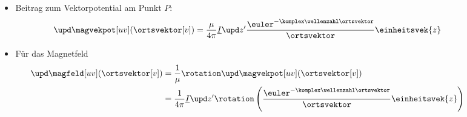 \begin{frame}
\begin{itemize}[<+->]
\begin{columns}
\begin{column}{.35\textwidth}
\begin{tikzpicture}[scale=5,tdplot_main_coords]
\end{tikzpicture}
\end{column}
\begin{column}{.65\textwidth}
  \begin{itemize}[<+->]
  \item Beitrag zum Vektorpotential am Punkt \(P\):
    \begin{equation*}
      \upd\magvekpot[uv](\ortsvektor[v]) = \frac{\mu}{4\pi} \underline{I} \upd z^\prime \frac{\euler^{-\komplex\wellenzahl\ortsvektor}}{\ortsvektor} \einheitsvek{z}
    \end{equation*}
  \item Für das Magnetfeld
    \begin{align*}
      \upd\magfeld[uv](\ortsvektor[v]) &= \frac{1}{\mu} \rotation \upd\magvekpot[uv](\ortsvektor[v])\\
      &= \frac{1}{4\pi} \underline{I} \upd z^\prime \rotation\left(\frac{\euler^{-\komplex\wellenzahl\ortsvektor}}{\ortsvektor} \einheitsvek{z}\right)
      \end{align*}
      \end{itemize}
\end{column}
\end{columns}

  \end{itemize}
  \end{frame}

